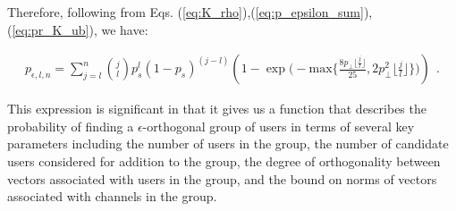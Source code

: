 Therefore, following from Eqs. (\ref{eq:K_rho}),(\ref{eq:p_epsilon_sum}),(\ref{eq:pr_K_ub}), we have:

\begin{equation}\label{eq:p_e_sum_exp}
    \begin{aligned}
        p_{\epsilon,l,n} = \sum_{j=l}^n \binom{j}{l}p_s^l(1-p_s)^{(j-l)} (1-\exp\bigg(-\text{max}\bigg\lbrace \frac{8p_\perp \lfloor \frac{j}{l} \rfloor}{25}, 2p_\perp^2 \lfloor \frac{j}{l} \rfloor\bigg\rbrace \bigg)) \ \ .
    \end{aligned}
\end{equation}

This expression is significant in that it gives us a function that describes the probability of finding a $\epsilon$-orthogonal group of users in terms of several key parameters including the number of users in the group, the number of candidate users considered for addition to the group, the degree of orthogonality between vectors associated with users in the group, and the bound on norms of vectors associated with channels in the group.